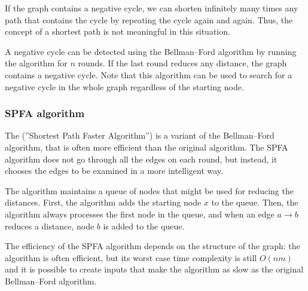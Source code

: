 If the graph contains a negative cycle,
we can shorten infinitely many times
any path that contains the cycle by repeating the cycle
again and again.
Thus, the concept of a shortest path
is not meaningful in this situation.

A negative cycle can be detected
using the Bellman–Ford algorithm by
running the algorithm for $n$ rounds.
If the last round reduces any distance,
the graph contains a negative cycle.
Note that this algorithm can be used to
search for
a negative cycle in the whole graph
regardless of the starting node.

\subsubsection{SPFA algorithm}


The  (''Shortest Path Faster Algorithm'') \cite{fan94}
is a variant of the Bellman–Ford algorithm,
that is often more efficient than the original algorithm.
The SPFA algorithm does not go through all the edges on each round,
but instead, it chooses the edges to be examined
in a more intelligent way.

The algorithm maintains a queue of nodes that might
be used for reducing the distances.
First, the algorithm adds the starting node $x$
to the queue.
Then, the algorithm always processes the
first node in the queue, and when an edge
$a \rightarrow b$ reduces a distance,
node $b$ is added to the queue.
%
%

The efficiency of the SPFA algorithm depends
on the structure of the graph:
the algorithm is often efficient,
but its worst case time complexity is still
$O(nm)$ and it is possible to create inputs
that make the algorithm as slow as the
original Bellman–Ford algorithm.

